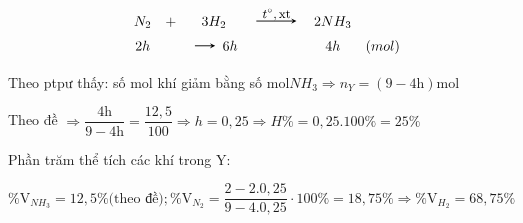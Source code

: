 \begin{vd}
{\begin{itemize}
		\[\begin{array}{ccccccc}
				&N_2&+&3 H_2& \xrightarrow[$t^\circ,\mathrm{xt}$][][][0.5]& 2 NH_3& \\
				&2h&&\xrightarrow[][][0.5] 6h&&4h& (mol)
		\end{array}\]
		
		Theo ptpư thấy: số mol khí giảm bằng số $\mathrm{mol} NH_3 \Rightarrow n_Y=(9-4\mathrm{h}) \mathrm{mol}$
		
		Theo đề $\Rightarrow \dfrac{4\mathrm{h}}{9-4\mathrm{h}}=\dfrac{12,5}{100} \Rightarrow h=0,25\Rightarrow H\%=0,25.100\%=25\%$
		
		Phần trăm thể tích các khí trong Y:
		
		$\% \mathrm{V}_{NH_3}=12,5 \% \text{(theo đề)}; \% \mathrm{V}_{N_2}=\dfrac{2-2.0,25}{9-4.0,25} \cdot 100 \%=18,75 \% \Rightarrow \% \mathrm{V}_{H_2}=68,75 \%$
		
	\end{itemize}	}
\end{vd}

